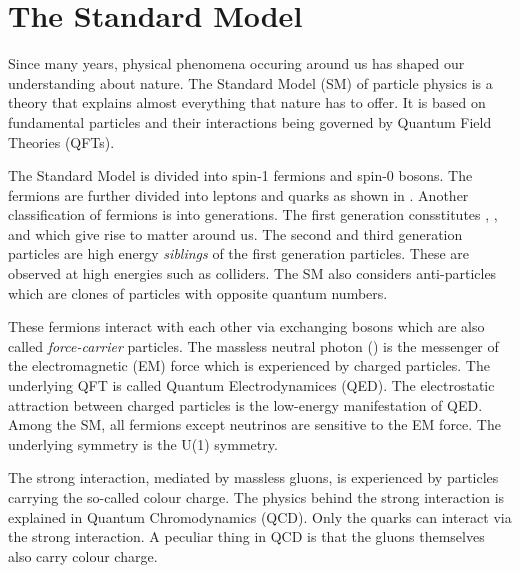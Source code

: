 
\chapter{The Standard Model}
\label{sec:SM}

Since many years, physical phenomena occuring around us has shaped our understanding about nature.
The Standard Model (SM) of particle physics is a theory that explains almost everything
that nature has to offer. It is based on fundamental particles and their interactions
being governed by Quantum Field Theories (QFTs). 

The Standard Model is divided into spin-1 fermions and spin-0 bosons. The fermions are
further divided into leptons and quarks as shown in . Another
classification of fermions is into generations. The first generation consstitutes
\Pup, \Pdown, \Pelectron and \Pnue which give rise to matter around us. The second
and third generation particles are high energy \textit{siblings} of the first generation
particles. These are observed at high energies such as colliders. The SM also considers
anti-particles which are clones of particles with opposite quantum numbers.

These fermions interact with each other via exchanging bosons which are also called 
\textit{force-carrier} particles. The massless neutral photon (\Pphoton) is the 
messenger of the electromagnetic (EM) force which is experienced by charged particles.
The underlying QFT is called Quantum Electrodynamices (QED). The electrostatic 
attraction between charged particles is the low-energy manifestation of QED. Among 
the SM, all fermions except neutrinos are sensitive to the EM force. The underlying symmetry
is the U(1) symmetry. 

The strong interaction, mediated by massless gluons, is experienced by particles 
carrying the so-called colour charge. The physics behind the strong interaction is 
explained in Quantum Chromodynamics (QCD). Only the quarks can interact via the 
strong interaction. A peculiar thing in QCD is that the gluons themselves also carry 
colour charge. 

